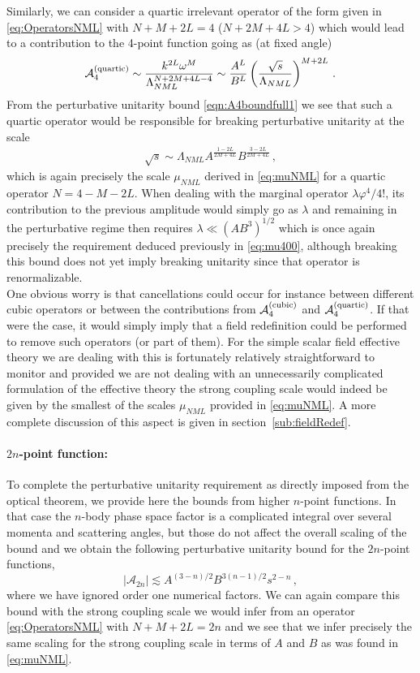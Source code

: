 \documentclass[12pt]{article}
\newcommand{\A}{\mathcal{A}}
\def\ba{\begin{eqnarray}}
\def\ea{\end{eqnarray}}
\def\({\left(}
\def\){\right)}
\def\A{\mathcal{A}}
\begin{document}
Similarly, we can consider a quartic irrelevant operator  of the form given in \eqref{eq:OperatorsNML} with $N+M+2L=4$ ($N+2M+4L> 4$) which would lead to a contribution to the 4-point function going as (at fixed angle)
\ba
\label{eq:A4quartic}
\A^{\rm (quartic)}_4 \sim \frac{k^{2L}\omega^M}{\Lambda_{NML}^{N+2M+4L-4}} \sim \frac{A^L}{B^L}\(\frac{\sqrt{s}}{\Lambda_{NML}}\)^{M+2L}\,.
\ea
From the perturbative unitarity bound \eqref{eqn:A4boundfull1} we see that such a quartic operator would be responsible for breaking perturbative unitarity at the scale
\ba
\sqrt{s}\sim \Lambda_{NML} A^{\frac{1-2L}{2M+4L}}B^{\frac{3-2L}{2M+4L}}\,,
\ea
 which is again precisely the scale $\mu_{NML}$ derived in \eqref{eq:muNML} for a quartic operator $N=4-M-2L$.
 When dealing with the marginal operator $\lambda \varphi^4/4!$, its contribution to the previous amplitude would simply go as $\lambda$ and remaining in the perturbative regime then requires $\lambda \ll (A B^3)^{1/2}$ which is once again precisely the requirement deduced previously in \eqref{eq:mu400}, although breaking this bound does not yet imply breaking unitarity since that operator is renormalizable. \\

One obvious worry is that cancellations could occur for instance between different cubic operators or between the contributions from $\A^{\rm (cubic)}_4$ and $\A^{\rm (quartic)}_4$. If that were the case, it would simply imply that a field redefinition could be performed to remove such operators (or part of them). For the simple scalar field effective theory we are dealing with this is fortunately relatively straightforward to monitor and provided we are not dealing with an unnecessarily complicated formulation of the effective theory the strong coupling scale would indeed be given by the smallest of the scales $\mu_{NML}$ provided  in \eqref{eq:muNML}. A more complete discussion of this aspect is given in section~\ref{sub:fieldRedef}. \\

\paragraph{$2n$-point function:}
To  complete the perturbative unitarity requirement as directly imposed from the optical theorem, we provide here the bounds from higher $n$-point functions. In that case the $n$-body phase space factor is a complicated integral over several momenta and scattering angles, but those do not affect the overall scaling of the bound and we obtain the following perturbative unitarity bound for the $2n$-point functions,
\begin{equation}
 | \A_{2n} |  \lesssim  A^{(3-n)/2}  B^{3(n-1)/2} s^{2-n} \,,
\label{eqn:A2nboundlow1}
\end{equation}
where we have ignored order one numerical factors.
We can again compare this bound with the strong coupling scale we would infer from an operator \eqref{eq:OperatorsNML} with $N+M+2L=2n$ and we see that we infer precisely the same scaling for the strong coupling scale in terms of $A$ and $B$ as was found in \eqref{eq:muNML}.
\end{document}
